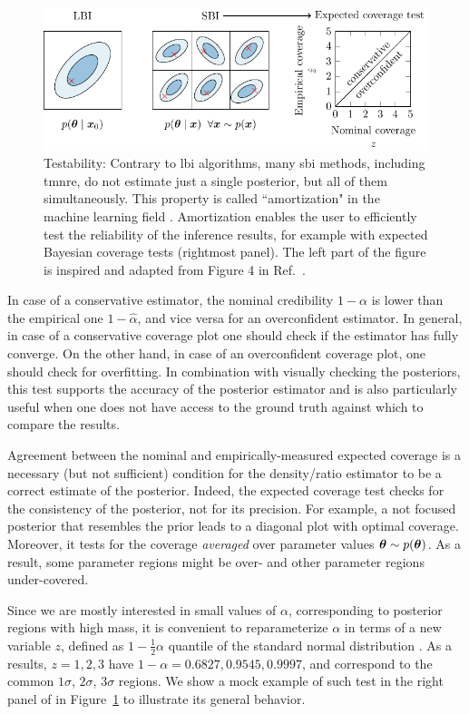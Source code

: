 \begin{figure}
	\centering
	\includegraphics[width=\linewidth]{TikZ/sbi_test.pdf}
	\caption{Testability: Contrary to \gls*{lbi} algorithms, many \gls*{sbi} methods, including \gls*{tmnre}, do not estimate just a single posterior, but all of them simultaneously. This property is called ``amortization" in the machine learning field \cite{amos2023tutorial}. Amortization enables the user to efficiently test the reliability of the inference results, for example with expected Bayesian coverage tests ({rightmost panel}). The left part of the figure is inspired and adapted from Figure 4 in Ref.~\cite{Cole:2021gwr}.
}
\label{fig:sbi-test}
\end{figure}


In case of a conservative estimator, the nominal credibility $1-\alpha$ is lower than the empirical one $1-\hat\alpha$, and vice versa for an overconfident estimator. In general, in case of a conservative coverage plot one should check if the estimator has fully converge. On the other hand, in case of an overconfident coverage plot, one should check for overfitting. In combination with visually checking the posteriors, this test supports the accuracy of the posterior estimator and is also particularly useful when one does not have access to the ground truth against which to compare the results. 

Agreement between the nominal and empirically-measured expected coverage is a necessary (but not sufficient) condition for the density/ratio estimator to be a correct estimate of the posterior. Indeed, the expected coverage test checks for the consistency of the posterior, not for its precision. For example, a not focused posterior that resembles the prior leads to a diagonal plot with optimal coverage. Moreover, it tests for the coverage \emph{averaged} over parameter values $\bm{\theta} \sim p(\bm{\theta})$. As a result, some parameter regions might be over- and other parameter regions under-covered.

Since we are mostly interested in small values of $\alpha$, corresponding to posterior regions with high mass, it is convenient to reparameterize $\alpha$ in terms of a new variable $z$, defined as $1-\frac12 \alpha$ quantile of the standard normal distribution \cite{Cole:2021gwr}. As a results,  $z = 1, 2, 3$ have $1-\alpha = 0.6827, 0.9545, 0.9997$, and correspond to the common $1\sigma$, $2\sigma$, $3\sigma$ regions. We show a mock example of such test in the right panel of in Figure~\ref{fig:sbi-test} to illustrate its general behavior.


